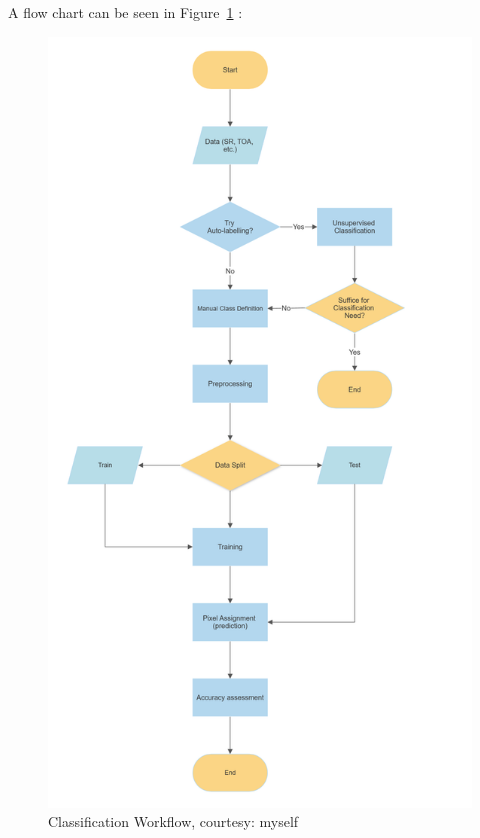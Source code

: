 \documentclass[
  letterpaper,
  DIV=11,
  numbers=noendperiod]{scrreprt}
\begin{document}
A flow chart can be seen in Figure~\ref{fig-flowchart} :

\begin{figure}

{\centering \includegraphics{./images/FlowChart.png}

}

\caption{\label{fig-flowchart}Classification Workflow, courtesy: myself}

\end{figure}
\end{document}
